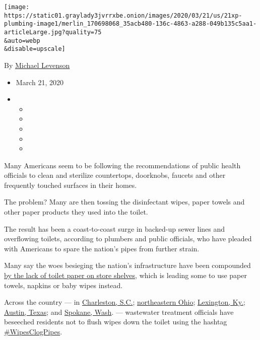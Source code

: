 \texttt{[image: https://static01.graylady3jvrrxbe.onion/images/2020/03/21/us/21xp-plumbing-image1/merlin\_170698068\_35acb480-136c-4863-a288-049b135c5aa1-articleLarge.jpg?quality=75\\\&auto=webp\\\&disable=upscale]}

By \href{https://www.nytimes3xbfgragh.onion/by/michael-levenson}{Michael
Levenson}

\begin{itemize}
\item
  March 21, 2020
\item
  \begin{itemize}
  \item
  \item
  \item
  \item
  \item
  \end{itemize}
\end{itemize}

Many Americans seem to be following the recommendations of public health
officials to clean and sterilize countertops, doorknobs, faucets and
other frequently touched surfaces in their homes.

The problem? Many are then tossing the disinfectant wipes, paper towels
and other paper products they used into the toilet.

The result has been a coast-to-coast surge in backed-up sewer lines and
overflowing toilets, according to plumbers and public officials, who
have pleaded with Americans to spare the nation's pipes from further
strain.

Many say the woes besieging the nation's infrastructure have been
compounded
\href{https://www.nytimes3xbfgragh.onion/2020/03/13/business/toilet-paper-shortage.html}{by
the lack of toilet paper on store shelves}, which is leading some to use
paper towels, napkins or baby wipes instead.

Across the country --- in
\href{https://abcnews4.com/news/local/flushable-wipes-clog-charleston-water-system-pipes-again-and-the-photos-are-gross}{Charleston,
S.C.};
\href{https://medium.com/@neorsd/important-reminder-wipes-clog-pipes-91d173195f65}{northeastern
Ohio};
\href{https://twitter.com/livegreenlex/status/1240281532452962304?s=20}{Lexington,
Ky.};
\href{https://twitter.com/AustinWater/status/1240325501375393793?s=20}{Austin,
Texas}; and
\href{https://twitter.com/SpokaneCity/status/1241394135854198784?s=20}{Spokane,
Wash}. --- wastewater treatment officials have beseeched residents not
to flush wipes down the toilet using the hashtag
\href{https://twitter.com/hashtag/WipesClogPipes?src=hashtag_click}{\#WipesClogPipes}.

